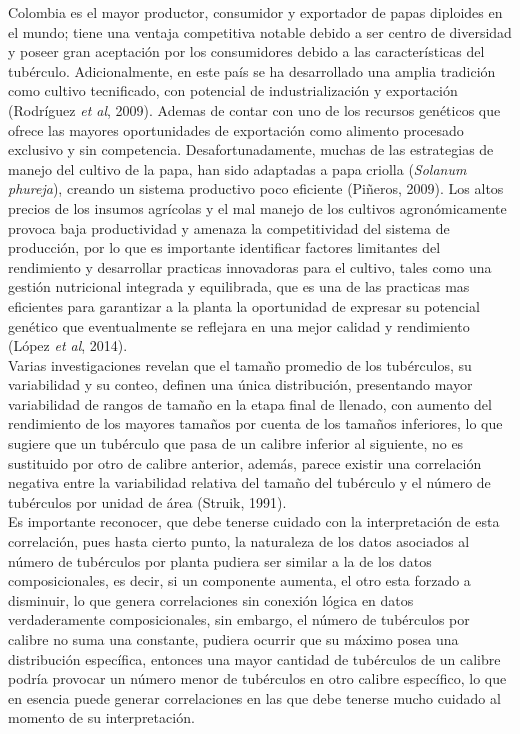Colombia es el mayor productor, consumidor y exportador de papas diploides en el mundo; tiene una ventaja competitiva notable debido a ser centro de diversidad y poseer gran aceptación por los consumidores debido a las características del tubérculo. Adicionalmente, en este país se ha desarrollado una amplia tradición como cultivo tecnificado, con potencial de industrialización y exportación (Rodríguez \textit{et al}, 2009). Ademas de contar con uno de los recursos genéticos que ofrece las mayores oportunidades de exportación como alimento procesado exclusivo y sin competencia. Desafortunadamente, muchas de las estrategias de manejo del cultivo de la papa, han sido adaptadas a papa criolla (\textit{Solanum phureja}), creando un sistema productivo poco eficiente (Piñeros, 2009). Los altos precios de los insumos agrícolas y el mal manejo de los cultivos agronómicamente provoca  baja productividad y amenaza la competitividad del sistema de producción, por lo que es importante identificar factores limitantes del rendimiento y desarrollar practicas innovadoras para el cultivo, tales como una gestión nutricional integrada y equilibrada, que es una de las practicas mas eficientes para garantizar a la planta la oportunidad de expresar su potencial genético que eventualmente se reflejara en una mejor calidad y rendimiento (López \textit{et al}, 2014).\\
 
Varias investigaciones revelan que el tamaño promedio de los tubérculos, su variabilidad y su conteo, definen una única distribución, presentando mayor variabilidad de rangos de tamaño en la etapa final de llenado, con aumento del rendimiento de los mayores tamaños por cuenta de los tamaños inferiores, lo que sugiere que un tubérculo que pasa de un calibre inferior al siguiente, no es sustituido por otro de calibre anterior, además, parece existir una correlación negativa entre la variabilidad relativa del tamaño del tubérculo y el número de tubérculos por unidad de área (Struik, 1991).\\

Es importante reconocer, que debe tenerse cuidado con la interpretación de esta correlación, pues hasta cierto punto, la naturaleza de los datos asociados al número de tubérculos por planta pudiera ser similar a la de los datos composicionales, es decir, si un componente aumenta, el otro esta forzado a disminuir, lo que genera correlaciones sin conexión lógica en datos verdaderamente composicionales, sin embargo, el número de tubérculos por calibre no suma una constante, pudiera ocurrir que su máximo posea una distribución específica, entonces una mayor cantidad de tubérculos de un calibre podría provocar un número menor de tubérculos en otro calibre espec\'ifico, lo que en esencia puede generar correlaciones en las que debe tenerse mucho cuidado al momento de su interpretación.\\

